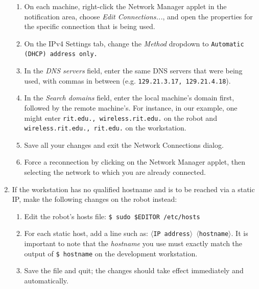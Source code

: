 \documentclass[12pt]{report}
\begin{document}
\begin{sloppypar}
\begin{enumerate}
\begin{enumerate}
\item{On each machine, right-click the Network Manager applet in the notification area, choose \textit{Edit Connections...}, and open the properties for the specific connection that is being used.}
\item{On the IPv4 Settings tab, change the \textit{Method} dropdown to \texttt{Automatic (DHCP) address only.}}
\item{In the \textit{DNS servers} field, enter the same DNS servers that were being used, with commas in between (e.g. \texttt{129.21.3.17, 129.21.4.18}).}
\item{In the \textit{Search domains} field, enter the local machine's domain first, followed by the remote machine's.  For instance, in our example, one might enter \texttt{rit.edu., wireless.rit.edu.} on the robot and \texttt{wireless.rit.edu., rit.edu.} on the workstation.}
\item{Save all your changes and exit the Network Connections dialog.}
\item{Force a reconnection by clicking on the Network Manager applet, then selecting the network to which you are already connected.}
\end{enumerate}
\item{If the workstation has no qualified hostname and is to be reached via a static IP, make the following changes on the robot instead:}
\begin{enumerate}
\item{Edit the robot's hosts file: \texttt{\$\ sudo \$EDITOR /etc/hosts}}
\item{For each static host, add a line such as: \texttt{$\langle$IP address$\rangle$ $\langle$hostname$\rangle$}.  It is important to note that the \textit{hostname} you use must exactly match the output of \texttt{\$\ hostname} on the development workstation.}
\item{Save the file and quit; the changes should take effect immediately and automatically.}
\end{enumerate}
\end{enumerate}
\end{sloppypar}
\end{document}
